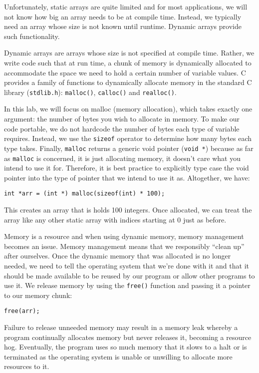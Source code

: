 \documentclass[12pt]{scrartcl}
\begin{document}
Unfortunately, static arrays are quite limited and for most applications,
we will not know how big an array needs to be at compile time.
Instead, we typically need an array whose size is not known until
runtime.  Dynamic arrays provide such functionality.

Dynamic arrays are arrays whose size is not specified at compile
time.  Rather, we write code such that at run time, a chunk of
memory is dynamically allocated to accommodate the space we
need to hold a certain number of variable values.  C provides a
family of functions to dynamically allocate memory in the standard
C library (\texttt{stdlib.h}): \texttt{malloc()},
\texttt{calloc()} and \texttt{realloc()}.

In this lab, we will focus on malloc (memory allocation), which takes
exactly one argument: the number of bytes you wish to allocate in
memory.  To make our code portable, we do not hardcode the number
of bytes each type of variable requires.  Instead, we use the
\texttt{sizeof} operator to determine how many bytes each
type takes.  Finally, \texttt{malloc} returns a generic void
pointer (\texttt{void *}) because as far as \texttt{malloc}
is concerned, it is just allocating memory, it doesn't care what you
intend to use it for.  Therefore, it is best practice to explicitly type
case the void pointer into the type of pointer that we intend to use
it as.  Altogether, we have:

\texttt{int *arr = (int *) malloc(sizeof(int) * 100);}

This creates an array that is holds 100 integers.  Once allocated,
we can treat the array like any other static array with indices
starting at 0 just as before.

Memory is a resource and when using dynamic memory, memory
management becomes an issue.  Memory management means
that we responsibly ``clean up'' after ourselves.  Once the dynamic
memory that was allocated is no longer needed, we need to tell
the operating system that we're done with it and that it should be
made available to be reused by our program or allow other
programs to use it.  We release memory by using the \texttt{free()}
function and passing it a pointer to our memory chunk:

\texttt{free(arr);}

Failure to release unneeded memory may result in a memory leak
whereby a program continually allocates memory but never releases
it, becoming a resource hog.  Eventually, the program uses so much
memory that it slows  to a halt or is terminated as the operating
system is unable or unwilling to allocate more resources to it.
\end{document}
